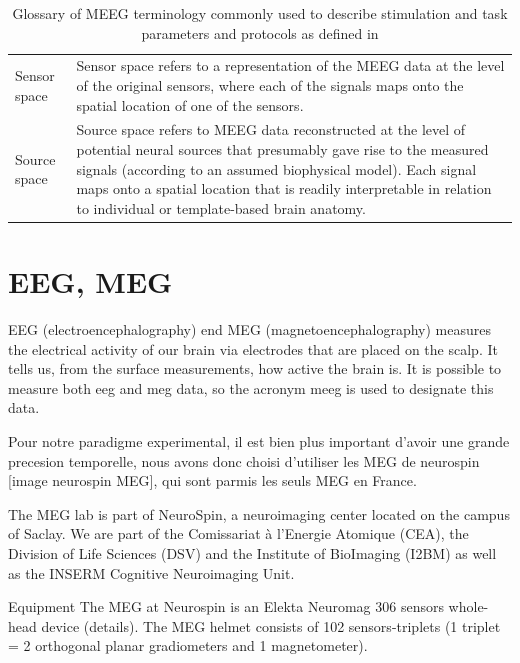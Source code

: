 \begin{table}[ht]
\begin{tabular}{@{}| p{3cm}|p{10cm}| @{}}
        Sensor space & Sensor space refers to a representation of the MEEG data at the level of the original sensors, where each of the signals maps onto the spatial location of one of the sensors.                                                                                                                                           \\
        Source space & Source space refers to MEEG data reconstructed at the level of potential neural sources that presumably gave rise to the measured signals (according to an assumed biophysical model). Each signal maps onto a spatial location that is readily interpretable in relation to individual or template-based brain anatomy. \\
        \hline
    \end{tabular}
    \caption{Glossary of MEEG terminology commonly used to describe stimulation and task parameters and protocols as defined in \cite{pernet2018best}}

    \label{Tab:Glossary_protocol}
\end{table}



\section{EEG, MEG}

EEG (electroencephalography) end MEG (magnetoencephalography) measures the electrical activity of our brain via electrodes that are placed on the scalp. It tells us, from the surface measurements, how active the brain is. It is possible to measure both eeg and meg data, so the acronym meeg is used to designate this data.

Pour notre paradigme experimental, il est bien plus important d'avoir une grande precesion temporelle, nous avons donc choisi d'utiliser les MEG de neurospin [image neurospin MEG], qui sont parmis les seuls MEG en France.


The MEG lab is part of NeuroSpin, a neuroimaging center located on the campus of Saclay. We are part of the Comissariat à l'Energie Atomique (CEA), the Division of Life Sciences (DSV) and the Institute of BioImaging (I2BM) as well as the INSERM Cognitive Neuroimaging Unit.

Equipment
The MEG at Neurospin is an Elekta Neuromag 306 sensors whole-head device (details). The MEG helmet consists of 102 sensors-triplets (1 triplet = 2 orthogonal planar gradiometers and 1 magnetometer).


